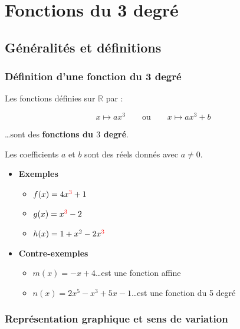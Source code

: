 \chapter{Fonctions du 3 degré}

\section{Généralités et définitions}

\subsection{Définition d'une fonction du 3 degré}

\begin{defin}
	Les fonctions définies sur $\mathbb{R}$ par :

	\[
		x \longmapsto ax^{3}\qquad\text{ou}\qquad x \longmapsto ax^{3}+b
	\]

	\ldots sont des \textbf{fonctions du $3$ degré}.

	Les coefficients $a$ et $b$ sont des réels donnés avec $a \neq 0$.

	\begin{itemize}
		\item \textbf{Exemples}
		      \begin{itemize}
			      \item $f(x)=4x^{\textcolor{red}{3}}+1$
			      \item $g(x)=x^{\textcolor{red}{3}}-2$
			      \item $h(x)=1+x^{2}-2x^{\textcolor{red}{3}}$
		      \end{itemize}
		\item \textbf{Contre-exemples}
		      \begin{itemize}
			      \item $m(x)=-x+4$\qquad\ldots est une fonction affine
			      \item $n(x)=2x^{5}-x^{3}+5x-1$\qquad\ldots est une fonction du 5 degré
		      \end{itemize}
	\end{itemize}
\end{defin}

\subsection{Représentation graphique et sens de variation}

